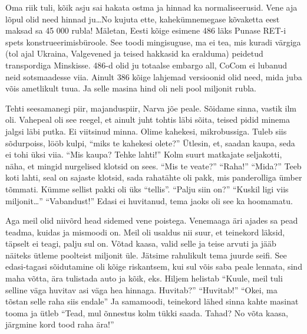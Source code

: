 Oma riik tuli, kõik asju sai hakata ostma ja hinnad ka normaliseerusid. Vene 
aja lõpul olid need hinnad ju\ldots No kujuta ette, kahekümnemegase kõvaketta 
eest maksad sa 45 000 rubla! Mäletan, Eesti kõige esimene 486 läks Punase 
RET-i spets konstrueerimisbüroole. See toodi mingisuguse, ma ei tea, 
mis kuradi värgiga (tol ajal Ukraina, Valgevened ja teised hakkasid ka 
eralduma)  peidetud transpordiga Minskisse. 486-d olid ju totaalse embargo all, 
CoCom ei lubanud neid sotsmaadesse 
viia. Ainult 386 kõige lahjemad versioonid olid need, mida juba võis ametlikult 
tuua. Ja selle masina hind oli neli pool miljonit rubla.


Tehti seesamanegi piir, majanduspiir, Narva jõe peale. Sõidame sinna, vastik 
ilm oli. Vahepeal oli see reegel, et ainult juht tohtis läbi sõita, teised 
pidid minema jalgsi läbi putka. Ei viitsinud minna. Olime kahekesi, 
mikrobussiga. Tuleb siis sõdurpoiss, lööb kulpi, \enquote{miks te kahekesi 
olete?} Ütlesin, et, saadan kaupa, seda ei tohi üksi viia. \enquote{Mis kaupa? 
Tehke lahti!} Kolm suurt matkajate seljakotti, näha, et mingid nurgelised 
klotsid on sees. \enquote{Mis te veate?} \enquote{Raha!} \enquote{Mida?} Teeb 
koti lahti, seal on sajaste klotsid, sada rahatähte oli pakk, mis panderolliga 
ümber tõmmati. Kümme sellist pakki oli üks \enquote{tellis}. \enquote{Palju 
siin on?} \enquote{Kuskil ligi viis miljonit\ldots} \enquote{Vabandust!} Edasi 
ei huvitanud, tema jaoks oli see ka hoomamatu. 

Aga meil olid niivõrd head sidemed vene poistega. Venemaaga äri ajades sa pead 
teadma, kuidas ja mismoodi on. Meil oli usaldus nii suur, et teinekord läksid,  
täpselt ei teagi, palju sul on. Võtad kaasa, valid selle ja teise arvuti ja 
jääb näiteks ütleme poolteist miljonit üle. Jätsime rahulikult tema juurde 
seifi. See edasi-tagasi sõidutamine oli kõige riskantsem, kui sul võis saba 
peale lennata, sind maha võtta, ära tulistada auto ja kõik, eks. Hiljem 
helistab \enquote{Kuule, meil tuli selline väga huvitav asi väga hea hinnaga. 
Huvitab?} \enquote{Huvitab!} \enquote{Okei, ma tõstan selle raha siis endale} 
Ja samamoodi, teinekord lähed sinna kahte masinat tooma ja ütleb \enquote{Tead, 
mul õnnestus kolm tükki saada. Tahad? No võta kaasa, järgmine kord tood raha 
ära!} 

